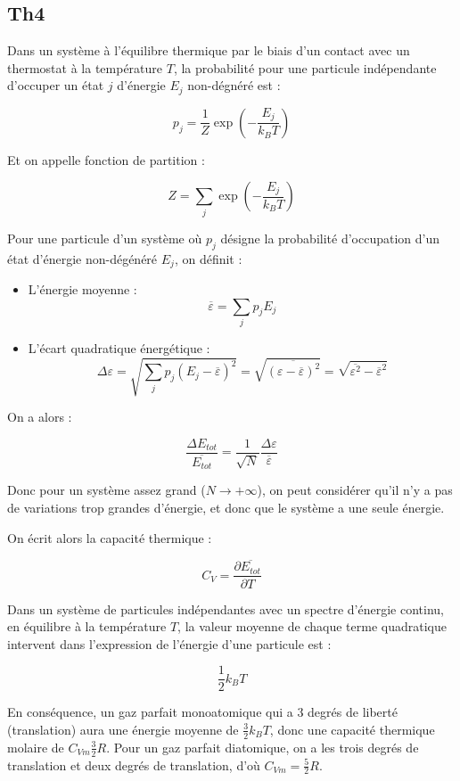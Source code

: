\documentclass[a4paper,12pt]{book}
\newcommand{\Def}[2]{\begin{tcolorbox}[colback=white,colframe=red!10!green!20!blue!75!, title=Définition : #1]#2\end{tcolorbox}}
\newcommand{\Thr}[2]{\begin{tcolorbox}[sharp corners, colback=white,colframe=red!10!blue!30!green!75!, title=Théorème : #1]#2\end{tcolorbox}}
\begin{document}
\subsection{Th4}
\Thr{Fonction de partition}{Dans un système à l'équilibre thermique par le biais d'un contact avec un thermostat à la température $T$, la probabilité pour une particule indépendante d'occuper un état $j$ d'énergie $E_j$ non-dégnéré est :
\par $$p_j = \frac{1}{Z}\exp\left(-\frac{E_j}{k_BT}\right)$$
\par Et on appelle fonction de partition :
\par $$Z = \sum\limits_{j}\exp\left(-\frac{E_j}{k_BT}\right)$$}
\Def{Moyenne et écart quadratique}{Pour une particule d'un système où $p_j$ désigne la probabilité d'occupation d'un état d'énergie non-dégénéré $E_j$, on définit :\begin{itemize}
\item L'énergie moyenne : $$\overline{\varepsilon} =\sum\limits_jp_jE_j$$
\item L'écart quadratique énergétique : $$\Delta\varepsilon = \sqrt{\sum\limits_jp_j(E_j-\overline{\varepsilon})^2}=\sqrt{\overline{(\varepsilon - \overline{\varepsilon})^2}}=\sqrt{\overline{\varepsilon^2}-\overline{\varepsilon}^2}$$
\end{itemize}
On a alors :
\par $$\frac{\Delta E_{tot}}{\overline{E_{tot}}} = \frac{1}{\sqrt{N}}\frac{\Delta\varepsilon}{\overline{\varepsilon}}$$
\par Donc pour un système assez grand ($N\to+\infty$), on peut considérer qu'il n'y a pas de variations trop grandes d'énergie, et donc que le système a une seule énergie.
\par On écrit alors la capacité thermique :
\par $$C_V = \dfrac{\partial \overline{E_{tot}}}{\partial T}$$}
\Thr{L'équipartition de l'énergie}{Dans un système de particules indépendantes avec un spectre d'énergie continu, en équilibre à la température $T$, la valeur moyenne de chaque terme quadratique intervent dans l'expression de l'énergie d'une particule est :
\par $$\frac{1}{2}k_BT$$
\par En conséquence, un gaz parfait monoatomique qui a 3 degrés de liberté (translation) aura une énergie moyenne de $\frac{3}{2}k_BT$, donc une capacité thermique molaire de $C_{Vm}\frac{3}{2}R$. Pour un gaz parfait diatomique, on a les trois degrés de translation et deux degrés de translation, d'où $C_{Vm} = \frac{5}{2}R$.}
\end{document}
